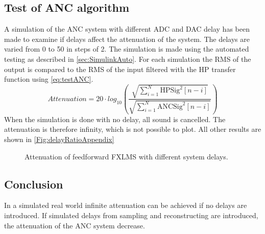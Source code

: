 \subsection{Test of ANC algorithm}
A simulation of the ANC system with different ADC and DAC delay has been made to examine if delays affect the attenuation of the system. The delays are varied from 0 to 50 in steps of 2. The simulation is made using the automated testing as described in \autoref{sec:SimulinkAuto}. For each simulation the RMS of the output is compared to the RMS of the input filtered with the HP transfer function using \autoref{eq:testANC}.
\begin{equation}\label{eq:testANC}
	Attenuation=20 \cdot log_{10}\left (\frac{\sqrt{\sum\limits_{i=1}^{N}\mathrm{HPSig}^2[n-i]}}{\sqrt{\sum\limits_{i=1}^{N}\mathrm{ANCSig}^2[n-i]}}  \right )
\end{equation}
When the simulation is done with no delay, all sound is cancelled. The attenuation is therefore infinity, which is not possible to plot. All other results are shown in \autoref{Fig:delayRatioAppendix}

\begin{figure}[H]
	\centering
	
	\caption{Attenuation of feedforward FXLMS with different system delays.}
	\label{Fig:delayRatioAppendix}
\end{figure}

\subsection{Conclusion}
In a simulated real world infinite attenuation can be achieved if no delays are introduced. If simulated delays from sampling and reconstructing are introduced, the attenuation of the ANC system decrease.